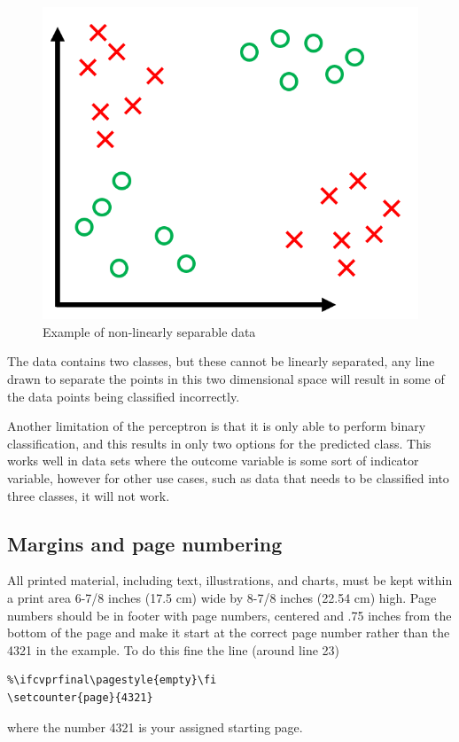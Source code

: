 \documentclass[10pt,twocolumn,a4paper]{article}
\begin{document}
\begin{figure}
    \centering
    \includegraphics[width=1\linewidth]{non-linearly-separable.png}
    \caption{Example of non-linearly separable data}
    \label{fig:non-linearly-separable}
\end{figure}

The data contains two classes, but these cannot be linearly separated, any line drawn to separate the points in this two dimensional space will result in some of the data points being classified incorrectly.

Another limitation of the perceptron is that it is only able to perform binary classification, and this results in only two options for the predicted class. This works well in data sets where the outcome variable is some sort of indicator variable, however for other use cases, such as data that needs to be classified into three classes, it will not work.


\subsection{Margins and page numbering}

All printed material, including text, illustrations, and charts, must be kept
within a print area 6-7/8 inches (17.5 cm) wide by 8-7/8 inches (22.54 cm)
high.
Page numbers should be in footer with page numbers, centered and .75
inches from the bottom of the page and make it start at the correct page
number rather than the 4321 in the example.  To do this fine the line (around
line 23)
\begin{verbatim}
%\ifcvprfinal\pagestyle{empty}\fi
\setcounter{page}{4321}
\end{verbatim}
where the number 4321 is your assigned starting page.
\end{document}

